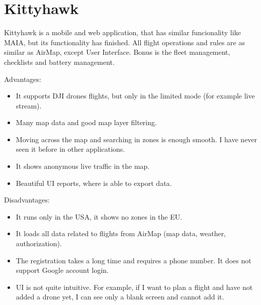 \section{Kittyhawk}\label{sec:kittyhawk}
Kittyhawk is a mobile and web application, that has similar funcionality like MAIA, but its functionality has finished.
All flight operations and rules are as similar as AirMap, except User Interface.
Bonus is the fleet management, checklists and battery management.

Advantages:
\begin{itemize}
    \item It supports DJI drones flights, but only in the limited mode (for example live stream).
    \item Many map data and good map layer filtering.
    \item Moving across the map and searching in zones is enough smooth.
    I have never seen it before in other applications.
    \item It shows anonymous live traffic in the map.
    \item Beautiful UI reports, where is able to export data.
\end{itemize}
Disadvantages:
\begin{itemize}
    \item It runs only in the USA, it shows no zones in the EU.
    \item It loads all data related to flights from AirMap (map data, weather, authorization).
    \item The registration takes a long time and requires a phone number.
    It does not support Google account login.
    \item UI is not quite intuitive.
    For example, if I want to plan a flight and have not added a drone yet, I can see only a blank screen and cannot add it.
\end{itemize}
